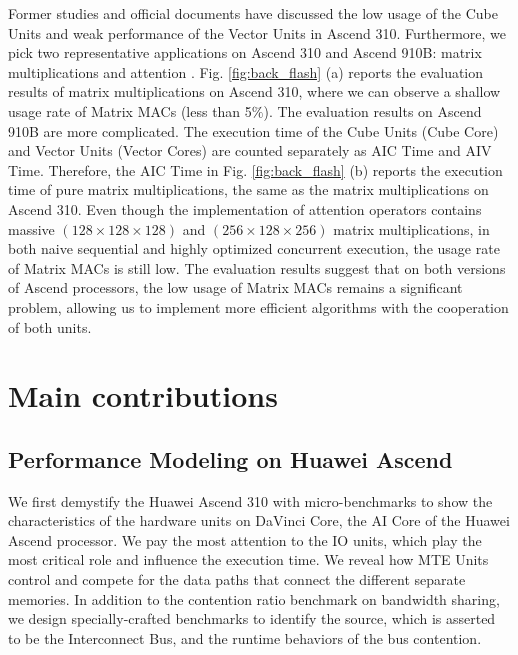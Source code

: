 Former studies and official documents \cite{moustafaaccelerating, cann_sugg} have discussed the low usage of the Cube Units and weak performance of the Vector Units in Ascend 310. Furthermore, we pick two representative applications on Ascend 310 and Ascend 910B: matrix multiplications and attention \cite{DBLP:conf/nips/VaswaniSPUJGKP17}. Fig. \ref{fig:back_flash} (a) reports the evaluation results of matrix multiplications on Ascend 310, where we can observe a shallow usage rate of Matrix MACs (less than 5$\%$). The evaluation results on Ascend 910B are more complicated. The execution time of the Cube Units (Cube Core) and Vector Units (Vector Cores) are counted separately as AIC Time and AIV Time. Therefore, the AIC Time in Fig. \ref{fig:back_flash} (b) reports the execution time of pure matrix multiplications, the same as the matrix multiplications on Ascend 310. Even though the implementation of attention operators contains massive $(128 \times 128 \times 128)$ and $(256 \times 128 \times 256)$ matrix multiplications, in both naive sequential and highly optimized concurrent execution, the usage rate of Matrix MACs is still low. The evaluation results suggest that on both versions of Ascend processors, the low usage of Matrix MACs remains a significant problem, allowing us to implement more efficient algorithms with the cooperation of both units.

\section{Main contributions}
\label{sec_1_3_contributions}

\subsection{Performance Modeling on Huawei Ascend}

We first demystify the Huawei Ascend 310 with micro-benchmarks to show the characteristics of the hardware units on DaVinci Core, the AI Core of the Huawei Ascend processor. We pay the most attention to the IO units, which play the most critical role and influence the execution time. We reveal how MTE Units control and compete for the data paths that connect the different separate memories. In addition to the contention ratio benchmark on bandwidth sharing, we design specially-crafted benchmarks to identify the source, which is asserted to be the Interconnect Bus, and the runtime behaviors of the bus contention.

